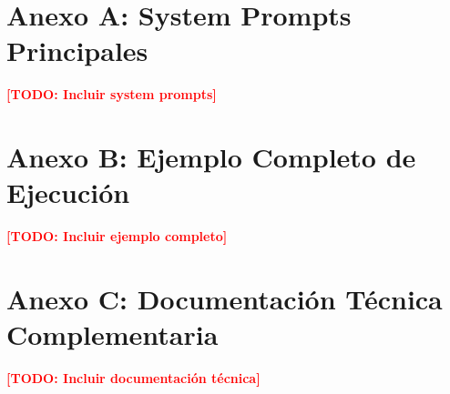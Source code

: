 \documentclass[12pt, letterpaper, oneside]{article}
\newcommand{\TODO}[1]{\textcolor{red}{\textbf{[TODO: #1]}}}
\begin{document}
\newpage
\appendix

\section{Anexo A: System Prompts Principales}
\label{sec:anexo-prompts}


\TODO{Incluir system prompts}


\section{Anexo B: Ejemplo Completo de Ejecución}
\label{sec:anexo-ejemplo}


\TODO{Incluir ejemplo completo}


\section{Anexo C: Documentación Técnica Complementaria}
\label{sec:anexo-tecnico}


\TODO{Incluir documentación técnica}


\newpage

\nocite{*}
\printbibliography[title=Referencias]
\end{document}

